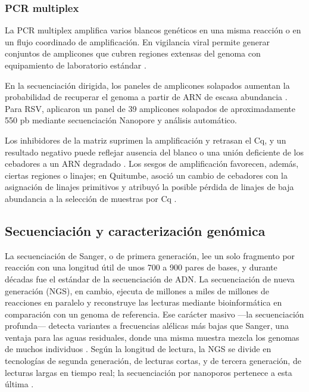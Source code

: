 \subsubsection{PCR multiplex}

La PCR multiplex amplifica varios blancos genéticos en una misma reacción o en un flujo coordinado de amplificación. En vigilancia viral permite generar conjuntos de amplicones que cubren regiones extensas del genoma con equipamiento de laboratorio estándar \cite{Le_2025}.

En la secuenciación dirigida, los paneles de amplicones solapados aumentan la probabilidad de recuperar el genoma a partir de ARN de escasa abundancia \cite{Child_2023}. Para RSV,  aplicaron un panel de 39 amplicones solapados de aproximadamente 550 pb mediante secuenciación Nanopore y análisis automático.

Los inhibidores de la matriz suprimen la amplificación y retrasan el Cq, y un resultado negativo puede reflejar ausencia del blanco o una unión deficiente de los cebadores a un ARN degradado \cite{Child_2023}. Los sesgos de amplificación favorecen, además, ciertas regiones o linajes; en Quitumbe,  asoció un cambio de cebadores con la asignación de linajes primitivos y atribuyó la posible pérdida de linajes de baja abundancia a la selección de muestras por Cq \cite{Parkins_2023}.

\subsection{Secuenciación y caracterización genómica}

La secuenciación de Sanger, o de primera generación, lee un solo fragmento por reacción con una longitud útil de unos 700 a 900 pares de bases, y durante décadas fue el estándar de la secuenciación de ADN. La secuenciación de nueva generación (NGS), en cambio, ejecuta de millones a miles de millones de reacciones en paralelo y reconstruye las lecturas mediante bioinformática en comparación con un genoma de referencia. Ese carácter masivo —la secuenciación profunda— detecta variantes a frecuencias alélicas más bajas que Sanger, una ventaja para las aguas residuales, donde una misma muestra mezcla los genomas de muchos individuos \cite{Karthikeyan_2022}. Según la longitud de lectura, la NGS se divide en tecnologías de segunda generación, de lecturas cortas, y de tercera generación, de lecturas largas en tiempo real; la secuenciación por nanoporos pertenece a esta última \cite{Dash_2024}.

